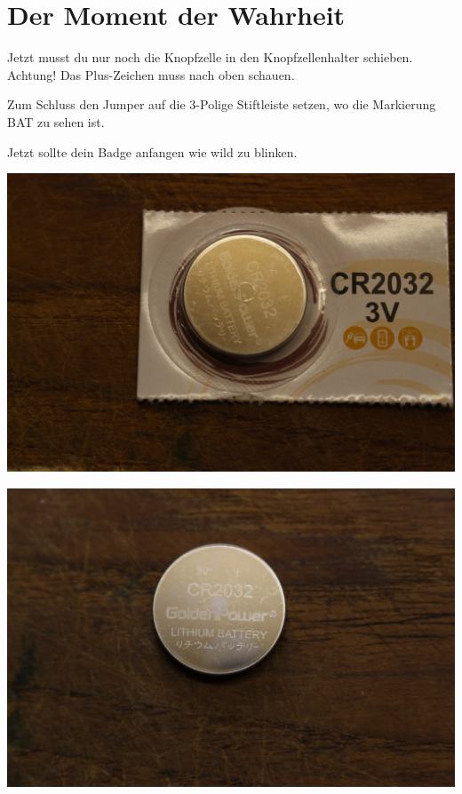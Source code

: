 \documentclass{article}
\begin{document}
\section{Der Moment der Wahrheit}

Jetzt musst du nur noch die Knopfzelle in den Knopfzellenhalter schieben.
Achtung! Das Plus-Zeichen muss nach oben schauen.

Zum Schluss den Jumper auf die 3-Polige Stiftleiste setzen, wo die Markierung BAT zu sehen ist.

Jetzt sollte dein Badge anfangen wie wild zu blinken.

\vspace{1cm}

\begin{minipage}[b]{0.5\textwidth}
	\includegraphics[width=\textwidth]{Bilder/IMG_5625.JPG}
\end{minipage}
\begin{minipage}[b]{0.5\textwidth}
	\includegraphics[width=\textwidth]{Bilder/IMG_5626.JPG}
\end{minipage}
\end{document}
